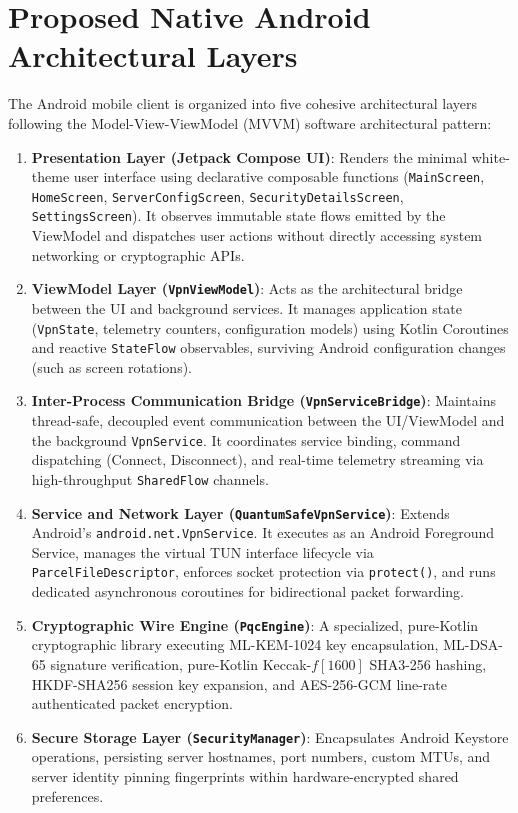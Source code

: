 \section{Proposed Native Android Architectural Layers}
\label{sec:android_layered_architecture}

The Android mobile client is organized into five cohesive architectural layers following the Model-View-ViewModel (MVVM) software architectural pattern:

\begin{enumerate}
    \item \textbf{Presentation Layer (Jetpack Compose UI)}: Renders the minimal white-theme user interface using declarative composable functions (\texttt{MainScreen}, \texttt{HomeScreen}, \texttt{ServerConfigScreen}, \texttt{SecurityDetailsScreen}, \texttt{SettingsScreen}). It observes immutable state flows emitted by the ViewModel and dispatches user actions without directly accessing system networking or cryptographic APIs.
    \item \textbf{ViewModel Layer (\texttt{VpnViewModel})}: Acts as the architectural bridge between the UI and background services. It manages application state (\texttt{VpnState}, telemetry counters, configuration models) using Kotlin Coroutines and reactive \texttt{StateFlow} observables, surviving Android configuration changes (such as screen rotations).
    \item \textbf{Inter-Process Communication Bridge (\texttt{VpnServiceBridge})}: Maintains thread-safe, decoupled event communication between the UI/ViewModel and the background \texttt{VpnService}. It coordinates service binding, command dispatching (Connect, Disconnect), and real-time telemetry streaming via high-throughput \texttt{SharedFlow} channels.
    \item \textbf{Service and Network Layer (\texttt{QuantumSafeVpnService})}: Extends Android's \texttt{android.net.VpnService}. It executes as an Android Foreground Service, manages the virtual TUN interface lifecycle via \texttt{ParcelFileDescriptor}, enforces socket protection via \texttt{protect()}, and runs dedicated asynchronous coroutines for bidirectional packet forwarding.
    \item \textbf{Cryptographic Wire Engine (\texttt{PqcEngine})}: A specialized, pure-Kotlin cryptographic library executing ML-KEM-1024 key encapsulation, ML-DSA-65 signature verification, pure-Kotlin Keccak-$f[1600]$ SHA3-256 hashing, HKDF-SHA256 session key expansion, and AES-256-GCM line-rate authenticated packet encryption.
    \item \textbf{Secure Storage Layer (\texttt{SecurityManager})}: Encapsulates Android Keystore operations, persisting server hostnames, port numbers, custom MTUs, and server identity pinning fingerprints within hardware-encrypted shared preferences.
\end{enumerate}

